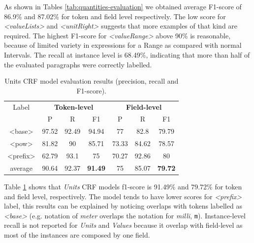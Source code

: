\documentclass[sigconf]{acmart}
\begin{document}
As shown in Tables \ref{tab:quantities-evaluation} we obtained average F1-score of 86.9\% and 87.02\% for token and field level respectively. The low score for \textit{<valueLists>} and \textit{<unitRight>} suggests that more examples of that kind are required. The highest F1-score for \textit{<valueRange>} above 90\% is reasonable, because of limited variety in expressions for a Range as compared with normal Intervals. 
The recall at instance level is 68.49\%, indicating that more than half of the evaluated paragraphs were correctly labelled.  

\begin{table}[ht]
    \caption{Units CRF model evaluation results (precision, recall and F1-score).}
    \label{tab:units-evaluation}
    \begin{tabular}{c|ccc|ccc}
        \toprule
        Label & \multicolumn{3}{c}{\textbf{Token-level}} & \multicolumn{3}{c}{\textbf{Field-level}}\\
        & P & R & F1 & P & R & F1 \\
        \midrule
        <base>    & 97.52 & 92.49 & 94.94 & 77    & 82.8  & 79.79 \\
        <pow>     & 81.82 & 90    & 85.71 & 73.33 & 84.62 & 78.57 \\
        <prefix>  & 62.79 & 93.1  & 75    & 70.27 & 92.86 & 80    \\
        \midrule
        average   & 90.64  & 92.37 & \textbf{91.49} & 75   & 85.07 & \textbf{79.72} \\
        \bottomrule
   \end{tabular}
\end{table}

Table \ref{tab:units-evaluation} shows that \textit{Units} CRF models f1-score is 91.49\% and 79.72\% for token and field level, respectively. The model tends to have lower scores for \textit{<prefix>} label, this results can be explained by noticing overlaps with tokens labelled as \textit{<base>} (e.g. notation of \textit{meter} overlaps the notation for \textit{milli}, \texttt{m}). Instance-level recall is not reported for \textit{Units} and \textit{Values} because it overlap with field-level as most of the instances are composed by one field. 
\end{document}
